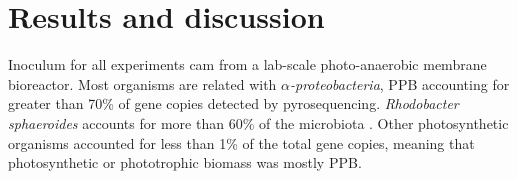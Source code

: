 \newpage
\section{Results and discussion}
Inoculum for all experiments cam from a lab-scale photo-anaerobic membrane bioreactor. Most organisms are related with $\alpha$\textit{-proteobacteria}, PPB accounting for greater than 70\% of gene copies detected by pyrosequencing. \textit{Rhodobacter sphaeroides} accounts for more than 60\% of the microbiota \cite{hulsen2016}. Other photosynthetic organisms accounted for less than 1\% of the total gene copies, meaning that photosynthetic or phototrophic biomass was mostly PPB. 














